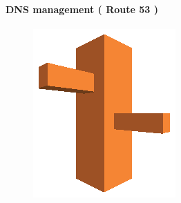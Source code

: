 \documentclass[
12pt,
english,
ngerman,
headsepline,
twoside,
openright,
numbers=noenddot,version=first
]{scrreprt}
\begin{document}
\paragraph{DNS management ( Route 53 )}
\begin{figure}
	\includegraphics[width=0.9\linewidth]{./pics/aws/NetworkingContentDelivery_AmazonRoute53.eps}
\end{figure}
\end{document}
